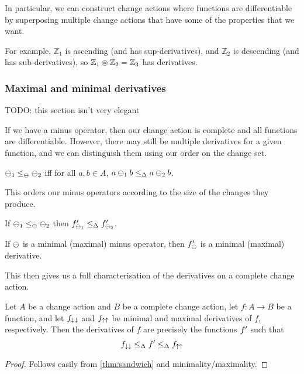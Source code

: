 In particular, we can construct change actions where functions are
differentiable by superposing multiple change actions that have some of the
properties that we want.

For example, $\mathbb{Z}_1$ is ascending (and has sup-derivatives), and
$\mathbb{Z}_2$ is descending (and has sub-derivatives), so $\mathbb{Z}_1
\circledast \mathbb{Z}_2 = \mathbb{Z}_3$ has derivatives.

\subsubsection{Maximal and minimal derivatives}

TODO: this section isn't very elegant

If we have a minus operator, then our change action is complete and all
functions are differentiable. However, there may still be multiple derivatives
for a given function, and we can distinguish them using our order on the change
set.

\begin{defn}
  $\ominus_1 \leq_\ominus \ominus_2$ iff for all $a,b \in A$, $a \ominus_1 b
  \leq_\Delta a \ominus_2 b$.
\end{defn}

This orders our minus operators according to the size of the changes they
produce. 

\begin{prop}
  If $\ominus_1 \leq_\ominus \ominus_2$ then
  $f'_{\ominus_1} \leq_\Delta f'_{\ominus_2}$.
\end{prop}

\begin{prop}
  If $\ominus$ is a minimal (maximal) minus operator, then $f'_\ominus$
  is a minimal (maximal) derivative.
\end{prop}

This then gives us a full characterisation of the derivatives on a complete
change action.

\begin{thm}
\label{thm:derivativeCharacterization}
  Let $A$ be a change action and $B$ be a complete change action, let
  $f: A \rightarrow B$ be a function, and let $f_{\downarrow\downarrow}$ and
  $f_{\uparrow\uparrow}$ be minimal and maximal derivatives of $f$, respectively.
  Then the derivatives of $f$ are precisely
  the functions $f'$ such that
  $$f_{\downarrow\downarrow} \leq_\Delta f' \leq_\Delta f_{\uparrow\uparrow}$$
\end{thm}
\ifproofs
\begin{proof}
  Follows easily from \cref{thm:sandwich} and minimality/maximality.
\end{proof}
\fi

